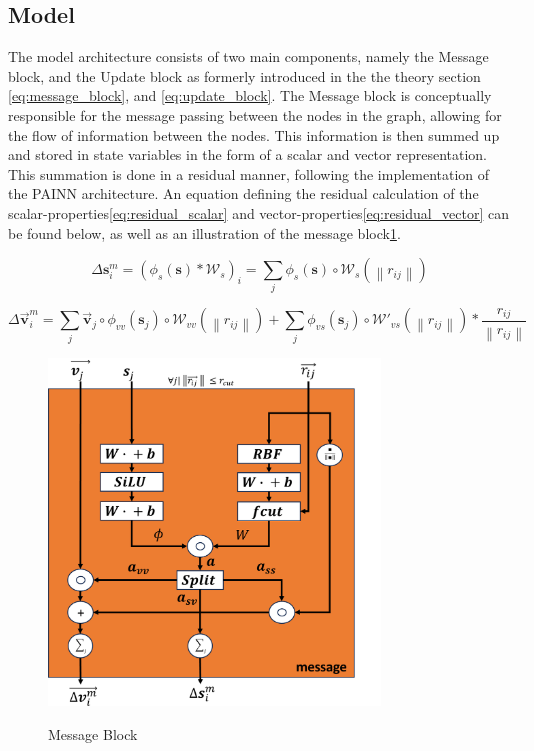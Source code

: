 \subsection{Model}\label{subsec:model}

The model architecture consists of two main components, namely the Message block, and the Update block as formerly introduced in the
the theory section \ref{eq:message_block}, and \ref{eq:update_block}.  The Message block is conceptually responsible
for the message passing between the nodes in the graph, allowing for the flow of information between the nodes.
This information is then summed up and stored in state variables in the form of a scalar and vector representation.
This summation is done in a residual manner, following the implementation of the PAINN architecture\cite{PAINN}. An equation
defining the residual calculation of the scalar-properties\ref{eq:residual_scalar} and vector-properties\ref{eq:residual_vector}
can be found below, as well as an illustration of the message block\ref{img:message_block}.

\begin{equation}\label{eq:residual_scalar}
    \Delta \mathbf{s}_{i}^{m}= (\phi_{s}(\mathbf{s}) * \mathcal{W}_{s})_{i} = \sum_{j} \phi_{s}(\mathbf{s}) \circ \mathcal{W}_{s} \left ( \left \| r_{ij} \right \| \right )
\end{equation}

\begin{equation}\label{eq:residual_vector}
    \Delta \vec{\mathbf{v}}_{i}^{m}= \sum_{j} \vec{\mathbf{v}}_{j} \circ \phi_{vv}(\mathbf{s}_{j}) \circ \mathcal{W}_{vv} \left ( \left \| r_{ij} \right \| \right ) + \sum_{j} \phi_{vs}(\mathbf{s}_{j}) \circ \mathcal{W}'_{vs} \left ( \left \| r_{ij} \right \| \right ) * \frac{r_{ij}}{\left \| r_{ij} \right \|}
\end{equation}

\begin{figure}[H]
    \caption{Message Block}
    \centering\label{img:message_block}
    \includegraphics[width=250pt]{Images/Method/message_block.png}
\end{figure}

